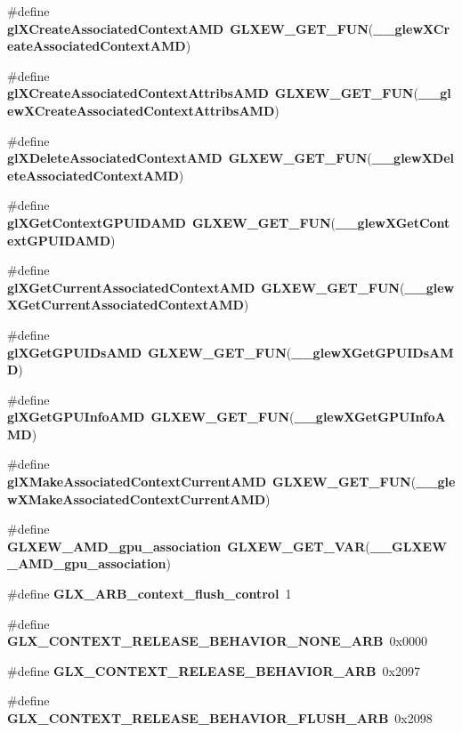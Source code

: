 \begin{DoxyCompactItemize}
\item 
\#define {\bf gl\+X\+Create\+Associated\+Context\+A\+MD}~{\bf G\+L\+X\+E\+W\+\_\+\+G\+E\+T\+\_\+\+F\+UN}({\bf \+\_\+\+\_\+glew\+X\+Create\+Associated\+Context\+A\+MD})
\item 
\#define {\bf gl\+X\+Create\+Associated\+Context\+Attribs\+A\+MD}~{\bf G\+L\+X\+E\+W\+\_\+\+G\+E\+T\+\_\+\+F\+UN}({\bf \+\_\+\+\_\+glew\+X\+Create\+Associated\+Context\+Attribs\+A\+MD})
\item 
\#define {\bf gl\+X\+Delete\+Associated\+Context\+A\+MD}~{\bf G\+L\+X\+E\+W\+\_\+\+G\+E\+T\+\_\+\+F\+UN}({\bf \+\_\+\+\_\+glew\+X\+Delete\+Associated\+Context\+A\+MD})
\item 
\#define {\bf gl\+X\+Get\+Context\+G\+P\+U\+I\+D\+A\+MD}~{\bf G\+L\+X\+E\+W\+\_\+\+G\+E\+T\+\_\+\+F\+UN}({\bf \+\_\+\+\_\+glew\+X\+Get\+Context\+G\+P\+U\+I\+D\+A\+MD})
\item 
\#define {\bf gl\+X\+Get\+Current\+Associated\+Context\+A\+MD}~{\bf G\+L\+X\+E\+W\+\_\+\+G\+E\+T\+\_\+\+F\+UN}({\bf \+\_\+\+\_\+glew\+X\+Get\+Current\+Associated\+Context\+A\+MD})
\item 
\#define {\bf gl\+X\+Get\+G\+P\+U\+I\+Ds\+A\+MD}~{\bf G\+L\+X\+E\+W\+\_\+\+G\+E\+T\+\_\+\+F\+UN}({\bf \+\_\+\+\_\+glew\+X\+Get\+G\+P\+U\+I\+Ds\+A\+MD})
\item 
\#define {\bf gl\+X\+Get\+G\+P\+U\+Info\+A\+MD}~{\bf G\+L\+X\+E\+W\+\_\+\+G\+E\+T\+\_\+\+F\+UN}({\bf \+\_\+\+\_\+glew\+X\+Get\+G\+P\+U\+Info\+A\+MD})
\item 
\#define {\bf gl\+X\+Make\+Associated\+Context\+Current\+A\+MD}~{\bf G\+L\+X\+E\+W\+\_\+\+G\+E\+T\+\_\+\+F\+UN}({\bf \+\_\+\+\_\+glew\+X\+Make\+Associated\+Context\+Current\+A\+MD})
\item 
\#define {\bf G\+L\+X\+E\+W\+\_\+\+A\+M\+D\+\_\+gpu\+\_\+association}~{\bf G\+L\+X\+E\+W\+\_\+\+G\+E\+T\+\_\+\+V\+AR}({\bf \+\_\+\+\_\+\+G\+L\+X\+E\+W\+\_\+\+A\+M\+D\+\_\+gpu\+\_\+association})
\item 
\#define {\bf G\+L\+X\+\_\+\+A\+R\+B\+\_\+context\+\_\+flush\+\_\+control}~1
\item 
\#define {\bf G\+L\+X\+\_\+\+C\+O\+N\+T\+E\+X\+T\+\_\+\+R\+E\+L\+E\+A\+S\+E\+\_\+\+B\+E\+H\+A\+V\+I\+O\+R\+\_\+\+N\+O\+N\+E\+\_\+\+A\+RB}~0x0000
\item 
\#define {\bf G\+L\+X\+\_\+\+C\+O\+N\+T\+E\+X\+T\+\_\+\+R\+E\+L\+E\+A\+S\+E\+\_\+\+B\+E\+H\+A\+V\+I\+O\+R\+\_\+\+A\+RB}~0x2097
\item 
\#define {\bf G\+L\+X\+\_\+\+C\+O\+N\+T\+E\+X\+T\+\_\+\+R\+E\+L\+E\+A\+S\+E\+\_\+\+B\+E\+H\+A\+V\+I\+O\+R\+\_\+\+F\+L\+U\+S\+H\+\_\+\+A\+RB}~0x2098

\end{DoxyCompactItemize}
